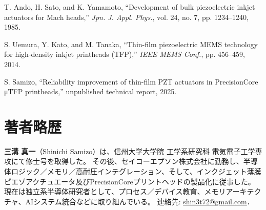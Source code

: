 \documentclass[conference]{IEEEtran}
\begin{document}
\begin{thebibliography}{99}

T. Ando, H. Sato, and K. Yamamoto, 
``Development of bulk piezoelectric inkjet actuators for Mach heads,'' 
\textit{Jpn. J. Appl. Phys.}, vol. 24, no. 7, pp. 1234--1240, 1985.

S. Uemura, Y. Kato, and M. Tanaka, 
``Thin-film piezoelectric MEMS technology for high-density inkjet printheads (TFP),'' 
\textit{IEEE MEMS Conf.}, pp. 456--459, 2014.

S. Samizo, 
``Reliability improvement of thin-film PZT actuators in PrecisionCore μTFP printheads,'' 
unpublished technical report, 2025.

\end{thebibliography}

\section*{著者略歴}
\textbf{三溝 真一}（Shinichi Samizo）は、信州大学大学院 工学系研究科 電気電子工学専攻にて修士号を取得した。  
その後、セイコーエプソン株式会社に勤務し、半導体ロジック／メモリ／高耐圧インテグレーション、そして、インクジェット薄膜ピエゾアクチュエータ及びPrecisionCoreプリントヘッドの製品化に従事した。  
現在は独立系半導体研究者として、プロセス／デバイス教育、メモリアーキテクチャ、AIシステム統合などに取り組んでいる。  
連絡先: \href{mailto:shin3t72@gmail.com}{shin3t72@gmail.com}．
\end{document}
